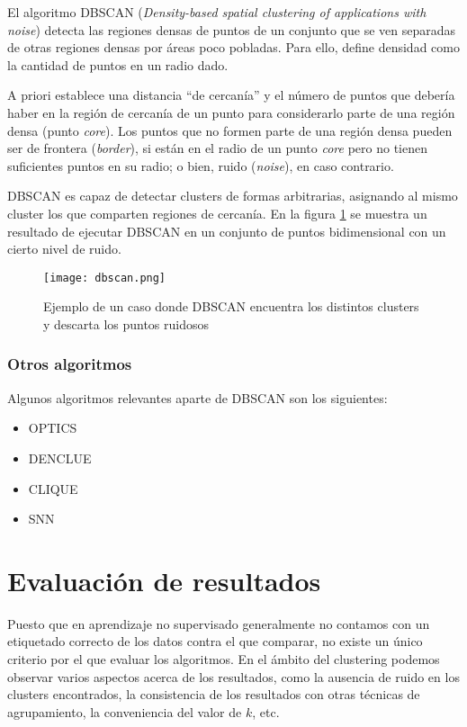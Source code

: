 \documentclass[a4paper,11pt,spanish]{report}
\let\stdsection\section
\let\stdsub\subsection
\let\stdsubsub\subsubsection
\renewcommand{\chapter}{\stdsection}
\renewcommand{\section}{\stdsub}
\renewcommand{\subsection}{\stdsubsub}
\begin{document}
El algoritmo DBSCAN (\emph{Density-based spatial clustering of applications with noise}) detecta las regiones densas de puntos de un conjunto que se ven separadas de otras regiones densas por áreas poco pobladas. Para ello, define densidad como la cantidad de puntos en un radio dado.

A priori establece una distancia ``de cercanía'' y el número de puntos que debería haber en la región de cercanía de un punto para considerarlo parte de una región densa (punto \emph{core}). Los puntos que no formen parte de una región densa pueden ser de frontera (\emph{border}), si están en el radio de un punto \emph{core} pero no tienen suficientes puntos en su radio; o bien, ruido (\emph{noise}), en caso contrario.

DBSCAN es capaz de detectar clusters de formas arbitrarias, asignando al mismo cluster los que comparten regiones de cercanía. En la figura \ref{fig.dbscan} se muestra un resultado de ejecutar DBSCAN en un conjunto de puntos bidimensional con un cierto nivel de ruido.

\begin{figure}[htbp]
\centering
\texttt{[image: dbscan.png]}
\caption{\label{fig.dbscan}Ejemplo de un caso donde DBSCAN encuentra los distintos clusters y descarta los puntos ruidosos}
\end{figure}

\subsection*{Otros algoritmos}
\label{sec-1-3-3-2}

Algunos algoritmos relevantes aparte de DBSCAN son los siguientes:
\begin{itemize}
\item OPTICS
\item DENCLUE
\item CLIQUE
\item SNN
\end{itemize}

\chapter{Evaluación de resultados}
\label{sec-1-4}

Puesto que en aprendizaje no supervisado generalmente no contamos con un etiquetado correcto de los datos contra el que comparar, no existe un único criterio por el que evaluar los algoritmos. En el ámbito del clustering podemos observar varios aspectos acerca de los resultados, como la ausencia de ruido en los clusters encontrados, la consistencia de los resultados con otras técnicas de agrupamiento, la conveniencia del valor de $k$, etc.
\end{document}
